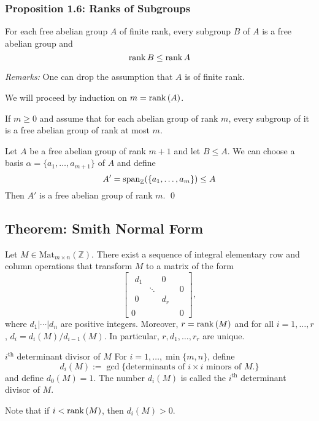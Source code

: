 \documentclass{article}
\renewenvironment{proof}{{\bfseries\color{blue1} Proof:}}{\qed}
\begin{document}
\subsubsection{Proposition 1.6: Ranks of Subgroups}
\begin{idea}
    For each free abelian group $A$ of finite rank, every subgroup $B$ of $A$ is a free abelian group and
    \begin{equation*}
        \mathrm{rank}\,B \le \mathrm{rank}\,A
    \end{equation*}
\end{idea}
\textit{Remarks:} One can drop the assumption that $A$ is of finite rank.

\begin{proof}
    We will proceed by induction on $m=\mathrm{rank}\,(A)$.

    If $m \ge 0$ and assume that for each abelian group of rank $m$, every subgroup of it is a free abelian group of rank at most $m$.

    Let $A$ be a free abelian group of rank $m+1$ and let $B \le A$. We can choose a basis $\alpha=\{a_1,\dots,a_{m+1}\}$ of $A$ and define
    \begin{equation*}
        A' = \mathrm{span}_{\mathbb{Z}}(\{a_1,\dots,a_m\}) \le A
    \end{equation*}
    Then $A'$ is a free abelian group of rank $m$.
\end{proof}

\subsection{Theorem: Smith Normal Form}
\begin{idea}
    Let $M \in \text{Mat}_{m\times n}(\mathbb{Z})$. There exist a sequence of integral elementary row and column operations that transform $M$ to a matrix of the form
    \begin{equation*}
        \left[
            \begin{array}{c|c}
                \begin{array}{ccc}
                    d_1 &        & 0   \\
                        & \ddots &     \\
                    0   &        & d_r
                \end{array} & 0 \\
                \hline
                0                          & 0
            \end{array}
            \right],
    \end{equation*}
    where $d_1|\cdots|d_n$ are positive integers. Moreover, $r=\mathrm{rank}\,(M)$ and for all $i=1,\dots,r$, $d_i=d_i(M)/d_{i-1}(M)$. In particular, $r,d_1,\dots,r_r$ are unique.
\end{idea}
\begin{definition}{$i^\text{th}$ determinant divisor of $M$}
    For $i=1,\dots,\min\{m,n\}$, define
    \begin{equation*}
        d_i(M) := \gcd\{\text{determinants of $i\times i$ minors of $M$.}\}
    \end{equation*}
    and define $d_0(M)=1$. The number $d_i(M)$ is called the $i^\text{th}$ determinant divisor of $M$.
\end{definition}
Note that if $i < \mathrm{rank}\,(M)$, then $d_i(M) > 0$.
\end{document}
